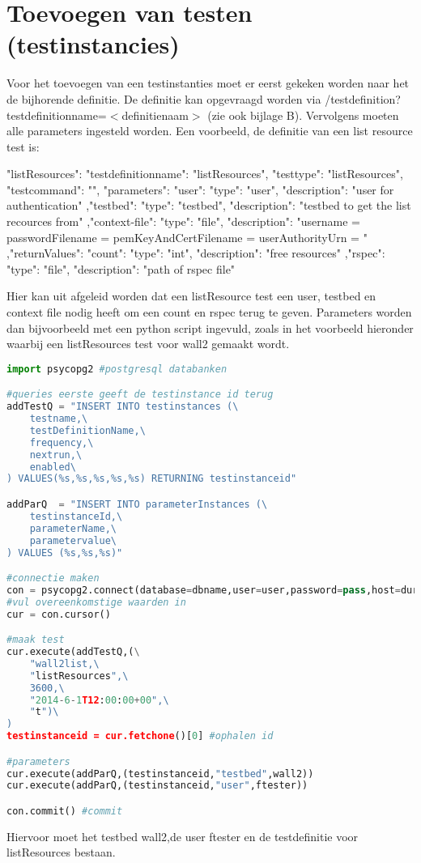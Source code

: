 \section{Toevoegen van testen (testinstancies)}
\npar
Voor het toevoegen van een testinstanties moet er eerst gekeken worden naar het de bijhorende definitie. De definitie kan opgevraagd worden via /testdefinition?testdefinitionname=$<$definitienaam$>$ (zie ook bijlage B). Vervolgens moeten alle parameters ingesteld worden. 
\npar 
Een voorbeeld, de definitie van een list resource test is:
\begin{lt}
    "listResources": {
        "testdefinitionname": "listResources",
        "testtype": "listResources",
        "testcommand": "",
        "parameters": {
            "user": {
                "type": "user",
                "description": "user for authentication"
            },"testbed": {
                "type": "testbed",
                "description": "testbed to get the list recources from"
            },"context-file": {
                "type": "file",
                "description": "username = \n    passwordFilename = \n    pemKeyAndCertFilename = \n    userAuthorityUrn = "
            }
        },"returnValues": {
            "count": {
                "type": "int",
                "description": "free resources"
            },"rspec": {
                "type": "file",
                "description": "path of rspec file"
            }
        }
    }
\end{lt}
\npar 
Hier kan uit afgeleid worden dat een listResource test een user, testbed en context file nodig heeft om een count en rspec terug te geven. Parameters worden dan bijvoorbeeld met een python script ingevuld, zoals in het voorbeeld hieronder waarbij een listResources test voor wall2 gemaakt wordt.
\clearpage
\begin{lstlisting}[language=Python]
import psycopg2 #postgresql databanken

#queries eerste geeft de testinstance id terug
addTestQ = "INSERT INTO testinstances (\
	testname,\
	testDefinitionName,\
	frequency,\
	nextrun,\
	enabled\
) VALUES(%s,%s,%s,%s,%s) RETURNING testinstanceid"

addParQ  = "INSERT INTO parameterInstances (\
	testinstanceId,\
	parameterName,\
	parametervalue\
) VALUES (%s,%s,%s)"

#connectie maken
con = psycopg2.connect(database=dbname,user=user,password=pass,host=durl) 
#vul overeenkomstige waarden in
cur = con.cursor()

#maak test
cur.execute(addTestQ,(\
	"wall2list,\
	"listResources",\
	3600,\
	"2014-6-1T12:00:00+00",\
	"t")\
)
testinstanceid = cur.fetchone()[0] #ophalen id

#parameters
cur.execute(addParQ,(testinstanceid,"testbed",wall2))	
cur.execute(addParQ,(testinstanceid,"user",ftester))

con.commit() #commit
\end{lstlisting}
\npar
Hiervoor moet het testbed wall2,de user ftester en de testdefinitie voor listResources bestaan.

